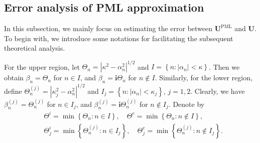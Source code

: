 \documentclass[final,3p,times]{elsarticle}
\begin{document}
\subsection{Error analysis of PML approximation}
In this subsection, we mainly focus on estimating the error between $\boldsymbol{U}^{\mathrm{PML}}$ and $\boldsymbol{U}$. To begin with, we introduce some notations for facilitating the subsequent theoretical analysis.

For the upper region, let $\Theta_n=\left|\kappa^2-\alpha_n^2\right|^{1 / 2}$ and $I=\left\{n:\left|\alpha_n\right|<\kappa\right\}$. Then we obtain $\beta_n=\Theta_n $ for $n \in I$, and $\beta_n=\mathbf{i} \Theta_n$ for $n \notin I$. Similarly, for the  lower region, define $\Theta_n^{(j)}=\left|\kappa_j^2-\alpha_n^2\right|^{1 / 2}$ and $I_j=\left\{n:\left|\alpha_n\right|<\kappa_j\right\}$, $j=1,2$. Clearly, we have $\beta_n^{(j)}=\Theta_n^{(j)}$ for $n \in I_j$, and $\beta_n^{(j)}=\mathbf{i} \Theta_n^{(j)}$ for $n \notin I_j$. Denote by
\begin{align*}
	&\Theta^{i}=\min \left\{\Theta_{n}: n \in I\right\}, \quad  \Theta^{e}=\min \left\{\Theta_{n}: n \notin I\right\},\\
	&\Theta_j^{i}=\min \left\{\Theta_n^{(j)}: n \in I_j\right\}, \quad \Theta_j^{e}=\min \left\{\Theta_n^{(j)}: n \notin I_j\right\}.
\end{align*}
\end{document}
